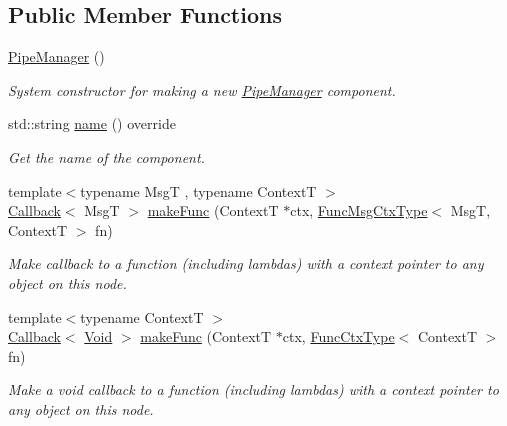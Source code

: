 \subsection*{Public Member Functions}
\begin{DoxyCompactItemize}
\item 
\hyperlink{structvt_1_1pipe_1_1_pipe_manager_aa2cf0e54dc146056c077aba1aa2ae42b}{Pipe\+Manager} ()
\begin{DoxyCompactList}\small\item\em System constructor for making a new \hyperlink{structvt_1_1pipe_1_1_pipe_manager}{Pipe\+Manager} component. \end{DoxyCompactList}\item 
std\+::string \hyperlink{structvt_1_1pipe_1_1_pipe_manager_aad60c922d604dd1b9ff47e428d265eed}{name} () override
\begin{DoxyCompactList}\small\item\em Get the name of the component. \end{DoxyCompactList}\item 
{\footnotesize template$<$typename MsgT , typename ContextT $>$ }\\\hyperlink{namespacevt_a36db99df4c973d48b1118a293fff533f}{Callback}$<$ MsgT $>$ \hyperlink{structvt_1_1pipe_1_1_pipe_manager_adb73a299b634a180ae3814b41b9ce255}{make\+Func} (ContextT $\ast$ctx, \hyperlink{structvt_1_1pipe_1_1_pipe_manager_base_a73fdf82ece0411b3dc644c99b763f7a9}{Func\+Msg\+Ctx\+Type}$<$ MsgT, ContextT $>$ fn)
\begin{DoxyCompactList}\small\item\em Make callback to a function (including lambdas) with a context pointer to any object on this node. \end{DoxyCompactList}\item 
{\footnotesize template$<$typename ContextT $>$ }\\\hyperlink{namespacevt_a36db99df4c973d48b1118a293fff533f}{Callback}$<$ \hyperlink{structvt_1_1pipe_1_1_pipe_manager_ab720c2580ecfd3ab36e49aeaaff64cc6}{Void} $>$ \hyperlink{structvt_1_1pipe_1_1_pipe_manager_a53201c2a1d558751fd3f2473a86678ab}{make\+Func} (ContextT $\ast$ctx, \hyperlink{structvt_1_1pipe_1_1_pipe_manager_base_ad8463823b6b4cfdb67c119d6d22e3bac}{Func\+Ctx\+Type}$<$ ContextT $>$ fn)
\begin{DoxyCompactList}\small\item\em Make a void callback to a function (including lambdas) with a context pointer to any object on this node. \end{DoxyCompactList}\item 

\end{DoxyCompactItemize}
